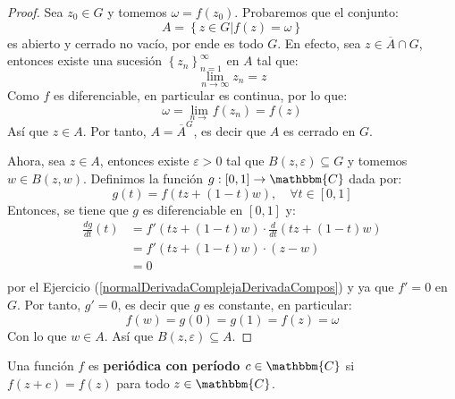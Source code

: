 \documentclass[12pt]{report}
\newcounter{it}
\theoremstyle{largebreak}
\newcommand\cf[3]{\ensuremath{#1:#2\rightarrow#3}}
\newcommand{\bbm}[1]{\ensuremath{\mathbbm{#1}}}
\begin{document}
    \begin{proof}
        Sea $z_0\in G$ y tomemos $\omega=f(z_0)$. Probaremos que el conjunto:
        \begin{equation*}
            A=\left\{z\in G\Big|f(z)=\omega \right\}
        \end{equation*}
        es abierto y cerrado no vacío, por ende es todo $G$. En efecto, sea $z\in\overline{A}\cap G$, entonces existe una sucesión $\left\{z_n \right\}_{ n=1}^\infty$ en $A$ tal que:
        \begin{equation*}
            \lim_{ n\rightarrow\infty}z_n=z
        \end{equation*}
        Como $f$ es diferenciable, en particular es continua, por lo que:
        \begin{equation*}
            \omega=\lim_{ n\rightarrow}f(z_n)=f(z)
        \end{equation*}
        Así que $z\in A$. Por tanto, $A=\overline{A}^G$, es decir que $A$ es cerrado en $G$.

        Ahora, sea $z\in A$, entonces existe $\varepsilon>0$ tal que $B(z,\varepsilon)\subseteq G$ y tomemos $w\in B(z,w)$. Definimos la función $\cf{g}{[0,1]}{\bbm{C}}$ dada por:
        \begin{equation*}
            g(t)=f(tz+(1-t)w),\quad\forall t\in[0,1]
        \end{equation*}
        Entonces, se tiene que $g$ es diferenciable en $[0,1]$ y:
        \begin{equation*}
            \begin{split}
                \frac{dg}{dt}(t)&=f'(tz+(1-t)w)\cdot \frac{d}{dt}(tz+(1-t)w)\\
                &=f'(tz+(1-t)w)\cdot(z-w)\\
                &=0\\
            \end{split}
        \end{equation*}
        por el Ejercicio (\ref{normalDerivadaComplejaDerivadaCompos}) y ya que $f'=0$ en $G$. Por tanto, $g'=0$, es decir que $g$ es constante, en particular:
        \begin{equation*}
            f(w)=g(0)=g(1)=f(z)=\omega
        \end{equation*}
        Con lo que $w\in A$. Así que $B(z,\varepsilon)\subseteq A$.
    \end{proof}

    \begin{mydef}
        Una función $f$ es \textbf{periódica con período $c\in\bbm{C}$} si $f(z+c)=f(z)$ para todo $z\in\bbm{C}$.
    \end{mydef}
\end{document}
